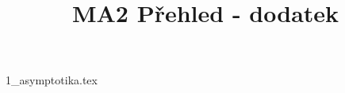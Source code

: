 \documentclass[a4paper]{article}
\begin{document}
\title{MA2 Přehled - dodatek}

\maketitle
\pagebreak

{1_asymptotika.tex}
\end{document}
